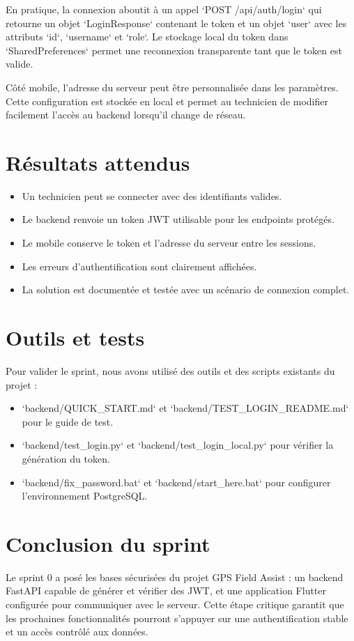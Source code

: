 \documentclass[12pt,a4paper]{report}
\begin{document}
\noindent En pratique, la connexion aboutit à un appel `POST /api/auth/login` qui retourne un objet `LoginResponse` contenant le token et un objet `user` avec les attributs `id`, `username` et `role`. Le stockage local du token dans `SharedPreferences` permet une reconnexion transparente tant que le token est valide.

\noindent Côté mobile, l'adresse du serveur peut être personnalisée dans les paramètres. Cette configuration est stockée en local et permet au technicien de modifier facilement l'accès au backend lorsqu'il change de réseau.

\section{Résultats attendus}
\begin{itemize}
    \item Un technicien peut se connecter avec des identifiants valides.
    \item Le backend renvoie un token JWT utilisable pour les endpoints protégés.
    \item Le mobile conserve le token et l'adresse du serveur entre les sessions.
    \item Les erreurs d'authentification sont clairement affichées.
    \item La solution est documentée et testée avec un scénario de connexion complet.
\end{itemize}

\section{Outils et tests}
\noindent Pour valider le sprint, nous avons utilisé des outils et des scripts existants du projet :
\begin{itemize}
    \item `backend/QUICK_START.md` et `backend/TEST_LOGIN_README.md` pour le guide de test.
    \item `backend/test_login.py` et `backend/test_login_local.py` pour vérifier la génération du token.
    \item `backend/fix_password.bat` et `backend/start_here.bat` pour configurer l'environnement PostgreSQL.
\end{itemize}

\section{Conclusion du sprint}
\noindent Le sprint 0 a posé les bases sécurisées du projet GPS Field Assist : un backend FastAPI capable de générer et vérifier des JWT, et une application Flutter configurée pour communiquer avec le serveur. Cette étape critique garantit que les prochaines fonctionnalités pourront s'appuyer sur une authentification stable et un accès contrôlé aux données.
\end{document}
